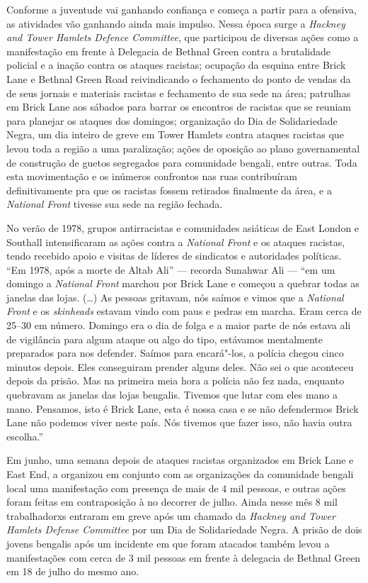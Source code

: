 Conforme a juventude vai ganhando confiança e começa a partir para a ofensiva, as atividades vão ganhando ainda mais impulso. Nessa época surge a \emph{Hackney and Tower Hamlets Defence Committee}, que participou de diversas ações como a manifestação em frente à Delegacia de Bethnal Green contra a brutalidade policial e a inação contra os ataques racistas; ocupação da esquina entre Brick Lane e Bethnal Green Road reivindicando o fechamento do ponto de vendas da  de seus jornais e materiais racistas e fechamento de sua sede na área; patrulhas em Brick Lane aos sábados para barrar os encontros de racistas que se reuniam para planejar os ataques dos domingos; organização do Dia de Solidariedade Negra, um dia inteiro de greve em Tower Hamlets contra ataques racistas que levou toda a região a uma paralização; ações de oposição ao plano governamental de construção de guetos segregados para comunidade bengali, entre outras. Toda esta movimentação e os inúmeros confrontos nas ruas contribuíram definitivamente pra que os racistas fossem retirados finalmente da área, e a \emph{National Front} tivesse sua sede na região fechada.

No verão de 1978, grupos antirracistas e comunidades asiáticas de East London e Southall intensificaram as ações contra a \emph{National Front} e os ataques racistas, tendo recebido apoio e visitas de líderes de sindicatos e autoridades políticas. ``Em 1978, após a morte de Altab Ali'' --- recorda Sunahwar Ali --- ``em um domingo a \emph{National Front} marchou por Brick Lane e começou a quebrar todas as janelas das lojas. (\ldots{}) As pessoas gritavam, nós saímos e vimos que a \emph{National Front} e os \emph{skinheads} estavam vindo com paus e pedras em marcha. Eram cerca de 25--30 em número. Domingo era o dia de folga e a maior parte de nós estava ali de vigilância para algum ataque ou algo do tipo, estávamos mentalmente preparados para nos defender. Saímos para encará"-los, a polícia chegou cinco minutos depois. Eles conseguiram prender alguns deles. Não sei o que aconteceu depois da prisão. Mas na primeira meia hora a polícia não fez nada, enquanto quebravam as janelas das lojas bengalis. Tivemos que lutar com eles mano a mano. Pensamos, isto é Brick Lane, esta é nossa casa e se não defendermos Brick Lane não podemos viver neste país. Nós tivemos que fazer isso, não havia outra escolha.''

Em junho, uma semana depois de ataques racistas organizados em Brick Lane e East End, a  organizou em conjunto com as organizações da comunidade bengali local uma manifestação com presença de mais de 4 mil pessoas, e outras ações foram feitas em contraposição à  no decorrer de julho. Ainda nesse mês 8 mil trabalhadorxs entraram em greve após um chamado da \emph{Hackney and Tower Hamlets Defense Committee} por um Dia de Solidariedade Negra. A prisão de dois jovens bengalis após um incidente em que foram atacados também levou a manifestações com cerca de 3 mil pessoas em frente à delegacia de Bethnal Green em 18 de julho do mesmo ano.

